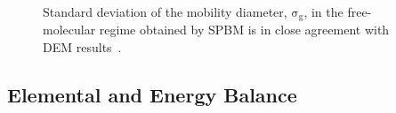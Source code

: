 \begin{figure}[H]
	\centering
	\begin{subfigure}[t]{0.4\textwidth}
	\end{subfigure}
	\caption{Standard deviation of the mobility diameter, $\mathrm{\sigma_g}$, in the free-molecular regime obtained by SPBM is in close agreement with DEM results~\citep{kholghy2021surface}.}
	\label{fig:coagvalid_sigma} 
\end{figure}


\subsection{Elemental and Energy Balance}

